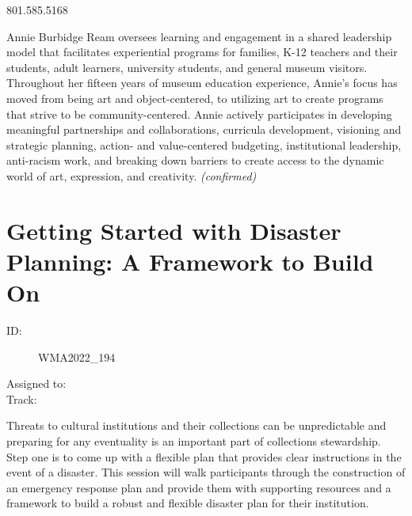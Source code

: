 \documentclass{report}
\begin{document}
                801.585.5168\newline

                Annie Burbidge Ream oversees learning and engagement in a shared leadership model that facilitates experiential programs for families, K-12 teachers and their students, adult learners, university students, and general museum visitors. Throughout her fifteen years of museum education experience, Annie's focus has moved from being art and object-centered, to utilizing art to create programs that strive to be community-centered. Annie actively participates in developing meaningful partnerships and collaborations, curricula development, visioning and strategic planning, action- and value-centered budgeting, institutional leadership, anti-racism work, and breaking down barriers to create access to the dynamic world of art, expression, and creativity.
                \emph{ (confirmed) }
              

              
        
          \newpage
          \section{ Getting Started with Disaster Planning: A Framework to Build On }
            \begin{description}
              \item [ID:]
              WMA2022\_194

              \item [Assigned to:]
                \item [Track:]
              \end{description}

              Threats to cultural institutions and their collections can be unpredictable and preparing for any eventuality is an important part of collections stewardship. Step one is to come up with a flexible plan that provides clear instructions in the event of a disaster. This session will walk participants through the construction of an emergency response plan and provide them with supporting resources and a framework to build a robust and flexible disaster plan for their institution.
\end{document}
